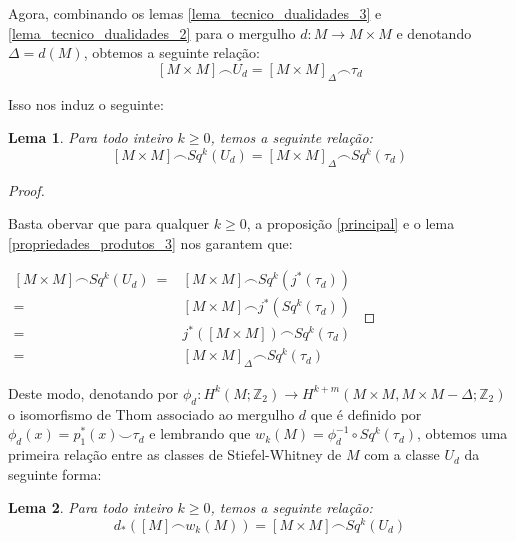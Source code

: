\documentclass[12pt,oneside]{book} %
\newtheorem{lem}    {\hspace{0.5cm}Lema}[chapter]
\newcommand{\Z}{\mathbb{Z}}
\newcommand{\ccup}{\smile}
\newcommand{\ccap}{\frown}
\begin{document}
\par Agora, combinando os lemas \ref{lema_tecnico_dualidades_3} e \ref{lema_tecnico_dualidades_2} para o mergulho $d:M\to M\times M$ e denotando $\Delta=d(M)$, obtemos a seguinte relação:
$$ [M\times M]\ccap U_{d}=[M\times M]_{\Delta}\ccap \tau_{d} $$

\par Isso nos induz o seguinte:

\begin{lem}
	Para todo inteiro $k\geq 0$, temos a seguinte relação:
	$$ [M\times M]\ccap Sq^{k}(U_{d})=[M\times M]_{\Delta}\ccap Sq^{k}(\tau_{d}) $$
\end{lem}
\begin{proof}
	
	\
	
	\par Basta obervar que para qualquer $k\geq 0$, a proposição \ref{principal} e o lema \ref{propriedades_produtos_3} nos garantem que:\newline
	
	$\begin{array}{rl}
		[M\times M]\ccap Sq^{k}(U_{d}) \ = & [M\times M]\ccap Sq^{k}(j^{*}(\tau_{d})) \\
		= & [M\times M]\ccap j^{*}(Sq^{k}(\tau_{d})) \\
		= & j^{*}([M\times M])\ccap Sq^{k}(\tau_{d}) \\
		= & [M\times M]_{\Delta}\ccap Sq^{k}(\tau_{d})
	\end{array}$
	
\end{proof}

\par Deste modo, denotando por $\phi_{d}:H^{k}(M;\Z_{2})\to H^{k+m}(M\times M,M\times M-\Delta;\Z_{2})$ o isomorfismo de Thom associado ao mergulho $d$ que é definido por $\phi_{d}(x)=p_{1}^{*}(x)\ccup\tau_{d}$ e lembrando que $w_{k}(M)=\phi^{-1}_{d}\circ Sq^{k}(\tau_{d})$, obtemos uma primeira relação entre as classes de Stiefel-Whitney de $M$ com a classe $U_{d}$ da seguinte forma:

\begin{lem}
	Para todo inteiro $k\geq 0$, temos a seguinte relação:
	$$ d_{*}([M]\ccap w_{k}(M))=[M\times M]\ccap Sq^{k}(U_{d}) $$
\end{lem}
\end{document}
